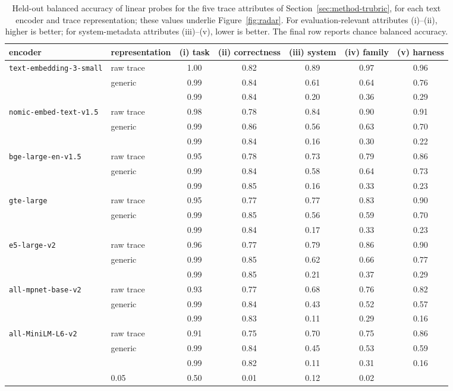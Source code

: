 \begin{table}[t]
\centering
\caption{Held-out balanced accuracy of linear probes for the five trace attributes of Section~\ref{sec:method-trubric}, for each text encoder and trace representation; these values underlie Figure~\ref{fig:radar}. For evaluation-relevant attributes (i)--(ii), higher is better; for system-metadata attributes (iii)--(v), lower is better. The final row reports chance balanced accuracy.}
\label{tab:probes}
\small
\begin{tabular}{llccccc}
\toprule
encoder & representation & {(i) task} & {(ii) correctness} & {(iii) system} & {(iv) family} & {(v) harness} \\
\midrule
\texttt{text-embedding-3-small} & raw trace & 1.00 & 0.82 & 0.89 & 0.97 & 0.96 \\
 & generic & 0.99 & 0.84 & 0.61 & 0.64 & 0.76 \\
 & \trubric{} & 0.99 & 0.84 & 0.20 & 0.36 & 0.29 \\
\addlinespace[2pt]
\texttt{nomic-embed-text-v1.5} & raw trace & 0.98 & 0.78 & 0.84 & 0.90 & 0.91 \\
 & generic & 0.99 & 0.86 & 0.56 & 0.63 & 0.70 \\
 & \trubric{} & 0.99 & 0.84 & 0.16 & 0.30 & 0.22 \\
\addlinespace[2pt]
\texttt{bge-large-en-v1.5} & raw trace & 0.95 & 0.78 & 0.73 & 0.79 & 0.86 \\
 & generic & 0.99 & 0.84 & 0.58 & 0.64 & 0.73 \\
 & \trubric{} & 0.99 & 0.85 & 0.16 & 0.33 & 0.23 \\
\addlinespace[2pt]
\texttt{gte-large} & raw trace & 0.95 & 0.77 & 0.77 & 0.83 & 0.90 \\
 & generic & 0.99 & 0.85 & 0.56 & 0.59 & 0.70 \\
 & \trubric{} & 0.99 & 0.84 & 0.17 & 0.33 & 0.23 \\
\addlinespace[2pt]
\texttt{e5-large-v2} & raw trace & 0.96 & 0.77 & 0.79 & 0.86 & 0.90 \\
 & generic & 0.99 & 0.85 & 0.62 & 0.66 & 0.77 \\
 & \trubric{} & 0.99 & 0.85 & 0.21 & 0.37 & 0.29 \\
\addlinespace[2pt]
\texttt{all-mpnet-base-v2} & raw trace & 0.93 & 0.77 & 0.68 & 0.76 & 0.82 \\
 & generic & 0.99 & 0.84 & 0.43 & 0.52 & 0.57 \\
 & \trubric{} & 0.99 & 0.83 & 0.11 & 0.29 & 0.16 \\
\addlinespace[2pt]
\texttt{all-MiniLM-L6-v2} & raw trace & 0.91 & 0.75 & 0.70 & 0.75 & 0.86 \\
 & generic & 0.99 & 0.84 & 0.45 & 0.53 & 0.59 \\
 & \trubric{} & 0.99 & 0.82 & 0.11 & 0.31 & 0.16 \\
\addlinespace[2pt]
\midrule
\multicolumn{2}{l}{chance} & 0.05 & 0.50 & 0.01 & 0.12 & 0.02 \\
\bottomrule
\end{tabular}
\end{table}
